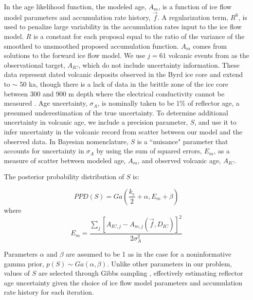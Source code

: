 In the age likelihood function, the modeled age, $A_m$, is a function of ice flow model parameters and accumulation rate history, $\vec{f}$. A regularization term, $R^6$, is used to penalize large variability in the accumulation rates input to the ice flow model. $R$ is a constant for each proposal equal to the ratio of the variance of the smoothed to unsmoothed proposed accumulation function. $A_m$ comes from solutions to the forward ice flow model. We use $j=61$ volcanic events from \citet{hammer1997} as the observational target, $A_{IC}$, which do not include uncertainty information. These data represent dated volcanic deposits observed in the Byrd ice core and extend to $\sim$ 50 ka, though there is a lack of data in the brittle zone of the ice core between 300 and 900 m depth where the electrical conductivity cannot be measured \citep{hammer1997}. Age uncertainty, $\sigma_A$, is nominally taken to be 1\% of reflector age, a presumed underestimation of the true uncertainty. To determine additional uncertainty in volcanic age, we include a precision parameter, $S$, and use it to infer uncertainty in the volcanic record from scatter between our model and the observed data. In Bayesian nomenclature, $S$ is a ``nuisance" parameter that accounts for uncertainty in $\sigma_A$ by using the sum of squared errors, $E_m$, as a measure of scatter between modeled age, $A_m$, and observed volcanic age, $A_{IC}$. 

The posterior probability distribution of $S$ is:

\begin{equation}\label{eqn:S}
PPD(S) = Ga(\frac{k_e}{2}+\alpha, E_m+\beta)
\end{equation}
where 
\begin{equation}
 E_m= \frac{\sum_{j}[A_{IC,j} - A_{m,j}(\vec{f},D_{IC})]^2}{2\sigma_A^2} 
\end{equation}

Parameters $\alpha$ and $\beta$ are assumed to be 1 as in the case for a noninformative gamma prior, $p(S)\sim Ga(\alpha,\beta)$. Unlike other parameters in our problem, values of $S$ are selected through Gibbs sampling \citep{gelfand1992}, effectively estimating reflector age uncertainty given the choice of ice flow model parameters and accumulation rate history for each iteration.





